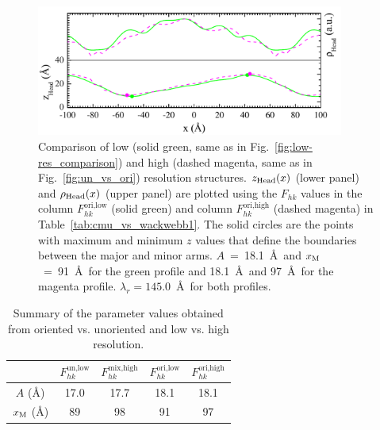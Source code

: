 \begin{figure}[htbp]
  \centering
  \includegraphics[width=0.9\textwidth]{figures/ripple/LAXS/high_vs_low}
  \caption[Comparison of low (solid green, same as in Fig.~\ref{fig:low-res_comparison}) 
  and high (dashed magenta, same as in Fig.~\ref{fig:un_vs_ori}) resolution structures]
  {Comparison of low (solid green, same as in Fig.~\ref{fig:low-res_comparison}) 
  and high (dashed magenta, same as in Fig.~\ref{fig:un_vs_ori}) resolution structures.
  $z_\text{Head}(x)$ (lower panel) and $\rho_\text{Head}(x)$ (upper panel) are plotted using the $F_{hk}$ values in the column 
  $F_{hk}^\text{ori,low}$ (solid green) and column $F_{hk}^\text{ori,high}$ (dashed magenta)
  in Table~\ref{tab:cmu_vs_wackwebb1}.
  The solid circles are the points with maximum and minimum $z$ values that 
  define the boundaries between the major and minor arms. 
  $A$~=~18.1~\AA\ and $x_\textrm{M}$~=~91~\AA\ for the green profile and 18.1~\AA\ and 97~\AA\
  for the magenta profile. $\lambda_r=145.0$~\AA\ for both profiles.
  }
  \label{fig:high_vs_low}
\end{figure}

\begin{table}
  \centering
  \begin{tabular}{ccccc}
    \hline
     & \multicolumn{1}{r}{$F_{hk}^\text{un,low}$} & \multicolumn{1}{r}{$F_{hk}^\text{mix,high}$} & \multicolumn{1}{r}{$F_{hk}^\text{ori,low}$} & \multicolumn{1}{r}{$F_{hk}^\text{ori,high}$} \\
    \hline
    $A$ (\AA)        & 17.0  & 17.7  & 18.1  & 18.1  \\
    $x_\textrm{M}$ (\AA)      & 89    & 98    & 91    & 97    \\
    \hline
  \end{tabular}
  \caption[Summary of the parameter values obtained from oriented vs. unoriented and
  low vs. high resolution]
  {Summary of the parameter values obtained from oriented vs. unoriented and
  low vs. high resolution.}
  \label{tab:oriented_vs_unoriented}
\end{table}

